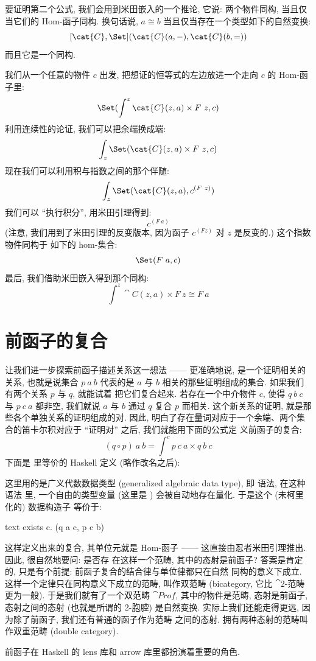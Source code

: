 要证明第二个公式, 我们会用到米田嵌入的一个推论, 它说: 两个物件同构, 当且仅当它们的 Hom-函子同构.
换句话说, $a \cong b$ 当且仅当存在一个类型如下的自然变换:
\[[\cat{C}, \Set](\cat{C}(a, -), \cat{C}(b, =))\]
而且它是一个同构.

我们从一个任意的物件 $c$ 出发, 把想证的恒等式的左边放进一个走向 $c$ 的 Hom-函子里:
\[\Set(\int^z \cat{C}(z, a)\times{}F\ z, c)\]
利用连续性的论证, 我们可以把余端换成端:
\[\int_z \Set(\cat{C}(z, a)\times{}F\ z, c)\]
现在我们可以利用积与指数之间的那个伴随:
\[\int_z \Set(\cat{C}(z, a), c^{(F\ z)})\]
我们可以 ``执行积分'', 用米田引理得到:
\[c^{(F\ a)}\]
(注意, 我们用到了米田引理的反变版本, 因为函子 $c^{(F z)}$ 对 $z$ 是反变的.) 这个指数物件同构于
如下的 hom-集合:
\[\Set(F\ a, c)\]
最后, 我们借助米田嵌入得到那个同构:
\[\int^z \cat{C}(z, a)\times{}F\ z \cong F\ a\]

\section{前函子的复合}

让我们进一步探索前函子描述关系这一想法 —— 更准确地说, 是一个证明相关的关系, 也就是说集合
$p\ a\ b$ 代表的是 $a$ 与 $b$ 相关的那些证明组成的集合. 如果我们有两个关系 $p$ 与 $q$, 就能试着
把它们复合起来. 若存在一个中介物件 $c$, 使得 $q\ b\ c$ 与 $p\ c\ a$ 都非空, 我们就说 $a$ 与
$b$ 通过 $q$ 复合 $p$ 而相关. 这个新关系的证明, 就是那些各个单独关系的证明组成的对.
因此, 明白了存在量词对应于一个余端、两个集合的笛卡尔积对应于 ``证明对'' 之后, 我们就能用下面的公式定
义前函子的复合:
\[(q \circ p)\ a\ b = \int^c p\ c\ a\times{}q\ b\ c\]
下面是  里等价的 Haskell 定义 (略作改名之后):

这里用的是广义代数数据类型 (generalized algebraic data type), 即  语法, 在这种语法
里, 一个自由的类型变量 (这里是 ) 会被自动地存在量化. 于是这个 (未柯里化的) 数据构造子
 等价于:

\begin{snip}{text}
exists c. (q a c, p c b)
\end{snip}
这样定义出来的复合, 其单位元就是 Hom-函子 —— 这直接由忍者米田引理推出. 因此, 很自然地要问: 是否存
在这样一个范畴, 其中的态射是前函子? 答案是肯定的, 只是有个前提: 前函子复合的结合律与单位律都只在自然
同构的意义下成立. 这样一个定律只在同构意义下成立的范畴, 叫作双范畴 (bicategory, 它比 $\cat{2}$-范畴
更为一般). 于是我们就有了一个双范畴 $\cat{Prof}$, 其中的物件是范畴, 态射是前函子, 态射之间的态射
(也就是所谓的 2-胞腔) 是自然变换. 实际上我们还能走得更远, 因为除了前函子, 我们还有普通的函子作为范畴
之间的态射. 拥有两种态射的范畴叫作双重范畴 (double category).

前函子在 Haskell 的 lens 库和 arrow 库里都扮演着重要的角色.
